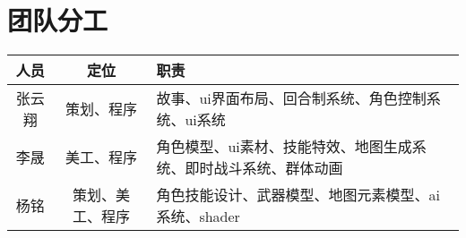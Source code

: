 \documentclass{article}
\begin{document}
\section{团队分工}
\begin{table}[htbp]
	\centering
	\begin{tabular}{|c|c|p{8cm}|}
		\hline
		人员 & 定位 & 职责 \\
		\hline
		张云翔 & 策划、程序 & 故事、ui界面布局、回合制系统、角色控制系统、ui系统 \\
		\hline
		李晟 & 美工、程序 & 角色模型、ui素材、技能特效、地图生成系统、即时战斗系统、群体动画 \\
		\hline
		杨铭 & 策划、美工、程序 & 角色技能设计、武器模型、地图元素模型、ai系统、shader \\
		\hline
	\end{tabular}
\end{table}
\end{document}
